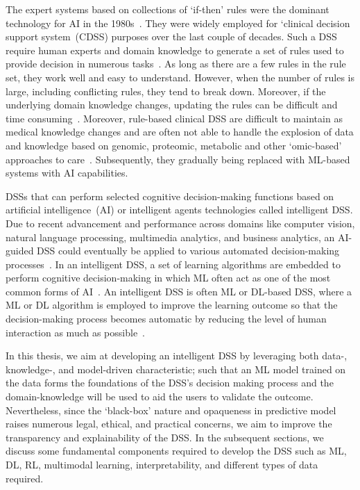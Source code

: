\hspace*{3.5mm} The expert systems based on collections of `if-then' rules were the dominant technology for AI in the 1980s~\cite{davenport2019potential}. They were widely employed for `clinical decision support system~(CDSS) purposes over the last couple of decades. Such a DSS require human experts and domain knowledge to generate a set of rules used to provide decision in numerous tasks~\cite{davenport2019potential}. 
As long as there are a few rules in the rule set, they work well and easy to understand. However, when the number of rules is large, including conflicting rules, they tend to break down. Moreover, if the underlying domain knowledge changes, updating the rules can be difficult and time consuming~\cite{davenport2019potential}. Moreover, rule-based clinical DSS are difficult to maintain as medical knowledge changes and are often not able to handle the explosion of data and knowledge based on genomic, proteomic, metabolic and other ‘omic-based’ approaches to care~\cite{das2020opportunities}.
Subsequently, they gradually being replaced with ML-based systems with AI capabilities. 

\hspace*{3.5mm} DSSs that can perform selected cognitive decision-making functions based on artificial intelligence~(AI) or intelligent agents technologies called intelligent DSS. Due to recent advancement and performance across domains like computer vision, natural language processing, multimedia analytics, and business analytics, an AI-guided DSS could eventually be applied to various automated decision-making processes~\cite{davenport2019potential}.  In an intelligent DSS, a set of learning algorithms are embedded to perform cognitive decision-making in which ML often act as one of the most common forms of AI~\cite{das2020opportunities}. An intelligent DSS is often ML or DL-based DSS, where a ML or DL algorithm is employed to improve the learning outcome so that the decision-making process becomes automatic by reducing the level of human interaction as much as possible~\cite{davenport2019potential}. 

\hspace*{3.5mm} In this thesis, we aim at developing an intelligent DSS by leveraging both data-, knowledge-, and model-driven characteristic; such that an ML model trained on the data forms the foundations of the DSS's decision making process and the domain-knowledge will be used to aid the users to validate the outcome. Nevertheless, since the `black-box' nature and opaqueness in predictive model raises numerous legal, ethical, and practical concerns, we aim to improve the transparency and explainability of the DSS. In the subsequent sections, we discuss some fundamental components required to develop the DSS such as ML, DL, RL, multimodal learning, interpretability, and different types of data required. 

